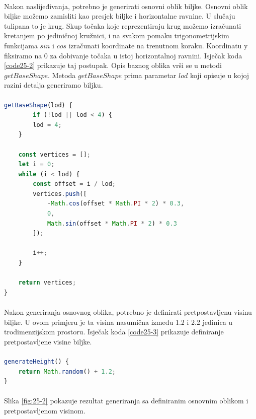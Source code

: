 \documentclass[times, utf8, diplomski]{fer}
\begin{document}
\paragraph{}
Nakon naslijeđivanja, potrebno je generirati osnovni oblik biljke. Osnovni oblik biljke 
možemo zamisliti kao presjek biljke i horizontalne ravnine. U slučaju tulipana to je krug.
Skup točaka koje reprezentiraju krug možemo izračunati kretanjem po jediničnoj kružnici, i 
na svakom pomaku trigonometrijskim funkcijama $sin$ i $cos$ izračunati koordinate na 
trenutnom koraku. Koordinatu y fiksiramo na 0 za dobivanje točaka u istoj horizontalnoj 
ravnini. Isječak koda \ref{code25-2} prikazuje taj postupak. Opis baznog oblika vrši se u 
metodi $getBaseShape$. Metoda $getBaseShape$ prima parametar $lod$ koji opisuje u kojoj 
razini detalja generiramo biljku.

\paragraph{}
\begin{lstlisting}[language=Javascript,caption=Generiranje osnovnog oblika biljke,label=code25-2]
getBaseShape(lod) {
		if (!lod || lod < 4) {
		lod = 4;
	}

	const vertices = [];
	let i = 0;
	while (i < lod) {
		const offset = i / lod;
		vertices.push([
			-Math.cos(offset * Math.PI * 2) * 0.3,
			0,
			Math.sin(offset * Math.PI * 2) * 0.3
		]);

		i++;
	}

	return vertices;
}
\end{lstlisting}

\paragraph{}
Nakon generiranja osnovnog oblika, potrebno je definirati pretpostavljenu visinu biljke.
U ovom primjeru je ta visina nasumična između 1.2 i 2.2 jedinica u trodimenzijskom 
prostoru. Isječak koda \ref{code25-3} prikazuje definiranje pretpostavljene visine biljke.
\paragraph{}
\begin{lstlisting}[language=Javascript,caption=Generiranje visine biljke,label=code25-3]
generateHeight() {
	return Math.random() + 1.2;
}
\end{lstlisting}
\paragraph{}
Slika \ref{fig:25-2} pokazuje rezultat generiranja sa definiranim osnovnim oblikom i 
pretpostavljenom visinom.
\end{document}
